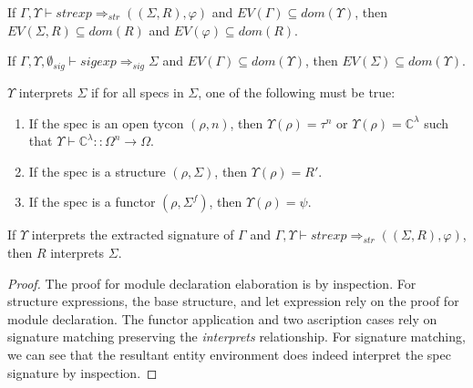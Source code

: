 \begin{lemma}\label{lem:entenvStrElab}
If $\Gamma,\Upsilon\vdash strexp \Rightarrow_{str}
((\Sigma,R),\varphi)$ and $EV(\Gamma)\subseteq dom(\Upsilon)$, then
$EV(\Sigma,R) \subseteq dom(R)$ and $EV(\varphi)\subseteq dom(R)$. 
\end{lemma}

\begin{lemma}\label{lem:entenvSigElab}
If $\Gamma,\Upsilon,\emptyset_{sig}\vdash sigexp \Rightarrow_{sig} \Sigma$ and $EV(\Gamma) \subseteq dom(\Upsilon)$, then $EV(\Sigma)\subseteq dom(\Upsilon)$. 
\end{lemma}

\begin{definition}\label{def:interprets}
$\Upsilon$ interprets $\Sigma$ if for all specs in $\Sigma$, one of the
following must be true:
\begin{enumerate}
\item If the spec is an open tycon $(\rho,n)$, then $\Upsilon(\rho)=\tau^n$
  or $\Upsilon(\rho)=\mathbb{C}^\lambda$ such that $\Upsilon\vdash
  \mathbb{C}^\lambda :: \Omega^n \to \Omega$. 
\item If the spec is a structure $(\rho,\Sigma)$, then $\Upsilon(\rho)=R'$. 
\item If the spec is a functor $(\rho,\Sigma^f)$, then 
  $\Upsilon(\rho)=\psi$. 
\end{enumerate}
\end{definition}


\begin{lemma}\label{lem:interprets}
If $\Upsilon$ interprets the extracted signature of $\Gamma$ and 
$\Gamma,\Upsilon\vdash strexp \Rightarrow_{str} ((\Sigma, R),
\varphi)$, then $R$ interprets $\Sigma$.
\end{lemma}
\begin{proof}
The proof for module declaration elaboration is by inspection. 
For structure expressions, the base structure, and let expression rely
on the proof for module declaration. The functor application and two
ascription cases rely on signature matching preserving the
\emph{interprets} relationship. For signature matching, we can see
that the resultant entity environment does indeed interpret the spec
signature by inspection. 
\end{proof}



